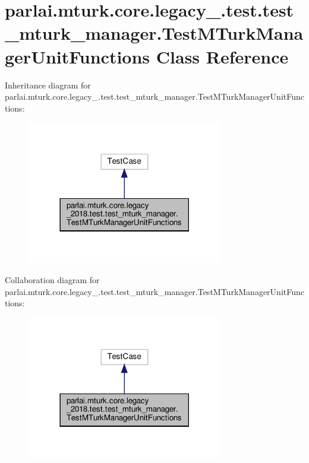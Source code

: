 \hypertarget{classparlai_1_1mturk_1_1core_1_1legacy__2018_1_1test_1_1test__mturk__manager_1_1TestMTurkManagerUnitFunctions}{}\section{parlai.\+mturk.\+core.\+legacy\+\_.\+test.\+test\+\_\+mturk\+\_\+manager.\+Test\+M\+Turk\+Manager\+Unit\+Functions Class Reference}
\label{classparlai_1_1mturk_1_1core_1_1legacy__2018_1_1test_1_1test__mturk__manager_1_1TestMTurkManagerUnitFunctions}


Inheritance diagram for parlai.\+mturk.\+core.\+legacy\+\_.\+test.\+test\+\_\+mturk\+\_\+manager.\+Test\+M\+Turk\+Manager\+Unit\+Functions\+:
\nopagebreak
\begin{figure}[H]
\begin{center}
\leavevmode
\includegraphics[width=242pt]{de/d3d/classparlai_1_1mturk_1_1core_1_1legacy__2018_1_1test_1_1test__mturk__manager_1_1TestMTurkManagerUnitFunctions__inherit__graph}
\end{center}
\end{figure}


Collaboration diagram for parlai.\+mturk.\+core.\+legacy\+\_.\+test.\+test\+\_\+mturk\+\_\+manager.\+Test\+M\+Turk\+Manager\+Unit\+Functions\+:
\nopagebreak
\begin{figure}[H]
\begin{center}
\leavevmode
\includegraphics[width=242pt]{d1/dbe/classparlai_1_1mturk_1_1core_1_1legacy__2018_1_1test_1_1test__mturk__manager_1_1TestMTurkManagerUnitFunctions__coll__graph}
\end{center}
\end{figure}
